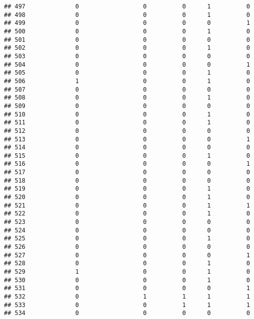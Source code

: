 \documentclass[
]{article}
\begin{document}
\begin{verbatim}
## 497              0                  0          0      1          0
## 498              0                  0          0      1          0
## 499              0                  0          0      0          1
## 500              0                  0          0      1          0
## 501              0                  0          0      0          0
## 502              0                  0          0      1          0
## 503              0                  0          0      0          0
## 504              0                  0          0      0          1
## 505              0                  0          0      1          0
## 506              1                  0          0      1          0
## 507              0                  0          0      0          0
## 508              0                  0          0      1          0
## 509              0                  0          0      0          0
## 510              0                  0          0      1          0
## 511              0                  0          0      1          0
## 512              0                  0          0      0          0
## 513              0                  0          0      0          1
## 514              0                  0          0      0          0
## 515              0                  0          0      1          0
## 516              0                  0          0      0          1
## 517              0                  0          0      0          0
## 518              0                  0          0      0          0
## 519              0                  0          0      1          0
## 520              0                  0          0      1          0
## 521              0                  0          0      1          1
## 522              0                  0          0      1          0
## 523              0                  0          0      0          0
## 524              0                  0          0      0          0
## 525              0                  0          0      1          0
## 526              0                  0          0      0          0
## 527              0                  0          0      0          1
## 528              0                  0          0      1          0
## 529              1                  0          0      1          0
## 530              0                  0          0      1          0
## 531              0                  0          0      0          1
## 532              0                  1          1      1          1
## 533              0                  0          1      1          1
## 534              0                  0          0      0          0

\end{verbatim}
\end{document}
